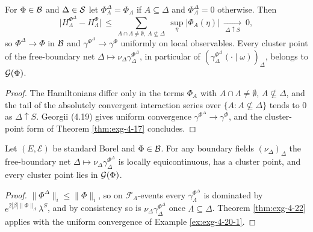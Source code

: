 \begin{example}
    \label{ex:exg-4-20-1}
    \leanok

    For $\Phi\in\mathcal{B}$ and $\Delta\in\mathcal{S}$ let $\Phi^\Delta_A=\Phi_A$ if $A\subseteq\Delta$
    and $\Phi^\Delta_A=0$ otherwise. Then
    \[\big|H^{\Phi^\Delta}_\Lambda-H^\Phi_\Lambda\big|\ \le\
      \sum_{A\cap\Lambda\neq\emptyset,\ A\not\subseteq\Delta}\ \sup_\eta|\Phi_A(\eta)|
      \ \xrightarrow[\ \Delta\uparrow S\ ]{}\ 0,\]
    so $\Phi^\Delta\to\Phi$ in $\mathcal{B}$ and $\gamma^{\Phi^\Delta}\to\gamma^\Phi$ uniformly
    on local observables. Every cluster point of the free-boundary net
    $\Delta\mapsto\nu_\Delta\gamma^{\Phi^\Delta}_\Delta$, in particular of
    $(\gamma^{\Phi^\Delta}_\Delta(\cdot\mid\omega))_\Delta$, belongs to $\mathcal{G}(\Phi)$.
\end{example}
\begin{proof}
    \leanok

    The Hamiltonians differ only in the terms $\Phi_A$ with $A\cap\Lambda\neq\emptyset$,
    $A\not\subseteq\Delta$, and the tail of the absolutely convergent interaction series over
    $\{A:A\not\subseteq\Delta\}$ tends to $0$ as $\Delta\uparrow S$. Georgii (4.19) gives
    uniform convergence $\gamma^{\Phi^\Delta}\to\gamma^\Phi$, and the cluster-point form of
    Theorem \ref{thm:exg-4-17} concludes.
\end{proof}

\begin{corollary}
    \label{cor:exg-free-boundary-existence}
    \leanok

    Let $(E,\mathcal E)$ be standard Borel and $\Phi\in\mathcal{B}$. For any boundary fields
    $(\nu_\Delta)_\Delta$ the free-boundary net $\Delta\mapsto\nu_\Delta\gamma^{\Phi^\Delta}_\Delta$
    is locally equicontinuous, has a cluster point, and every cluster point lies in
    $\mathcal{G}(\Phi)$.
\end{corollary}
\begin{proof}
    \leanok

    $\|\Phi^\Delta\|_i\le\|\Phi\|_i$, so on $\mathcal F_\Lambda$-events every
    $\gamma^{\Phi^\Delta}_\Lambda$ is dominated by $e^{2|\beta|\|\Phi\|_\Lambda}\lambda^S$, and
    by consistency so is $\nu_\Delta\gamma^{\Phi^\Delta}_\Delta$ once $\Lambda\subseteq\Delta$.
    Theorem \ref{thm:exg-4-22} applies with the uniform convergence of
    Example \ref{ex:exg-4-20-1}.
\end{proof}

